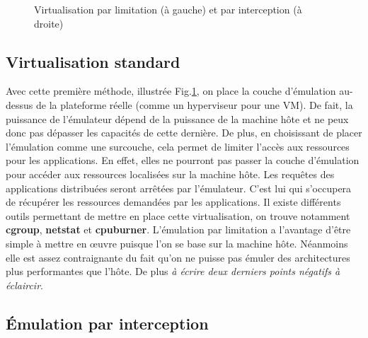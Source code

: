 \begin{figure}[H]
\begin{subfigure}{0.3\textwidth}
  \end{subfigure}
  \caption{Virtualisation par limitation (à gauche) et par interception (à
    droite)}
  \label{TYPE_VIRTUALISATION}
\end{figure}

\subsection{Virtualisation standard}
\label{section:limitation}

Avec cette première méthode, illustrée Fig.\ref{TYPE_VIRTUALISATION}, on place la couche d'émulation au-dessus de la
plateforme réelle (comme un hyperviseur pour une VM). De fait, la puissance de
l'émulateur dépend de la puissance de la machine hôte et ne peux donc pas
dépasser les capacités de cette dernière. De plus, en choisissant de placer
l'émulation comme une surcouche, cela permet de limiter l'accès aux ressources
pour les applications. En effet, elles ne pourront pas passer la couche
d'émulation pour accéder aux ressources localisées sur la machine hôte. Les
requêtes des applications distribuées seront arrêtées par l'émulateur. C'est lui
qui s'occupera de récupérer les ressources demandées par les applications. Il
existe différents outils permettant de mettre en place cette virtualisation, on
trouve notamment \textbf{cgroup}, \textbf{netstat} et \textbf{cpuburner}.  L'émulation par limitation a l'avantage d'être simple à mettre en \oe uvre puisque
l'on se base sur la machine hôte. Néanmoins elle est assez contraignante du fait
qu'on ne puisse pas émuler des architectures plus performantes que l'hôte. De
plus {\color{red} \textit{à écrire deux derniers points négatifs à éclaircir}}.

\subsection{Émulation par interception}
\label{section:interception}

